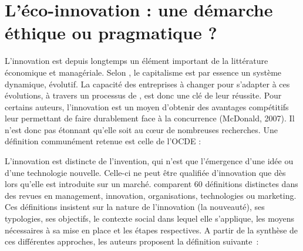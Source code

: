 \section{L'éco-innovation : une démarche éthique ou pragmatique ?}



    L'innovation est depuis longtemps un élément important de la littérature économique et managériale. Selon \textcite{schumpeter2006capitalism}, le capitalisme est par essence un système dynamique, évolutif. La capacité des entreprises à changer pour s’adapter à ces évolutions, à travers un processus de , est donc une clé de leur réussite. Pour certains auteurs, l’innovation est un moyen d’obtenir des avantages compétitifs leur permettant de faire durablement face à la concurrence (McDonald, 2007). Il n’est donc pas étonnant qu’elle soit au cœur de nombreuses recherches. Une définition communément retenue est celle de l’OCDE \parencite{oecd2005oslo} :
    \begin{quotation}
    \end{quotation}

    L’innovation est distincte de l’invention, qui n’est que l’émergence d’une idée ou d’une technologie nouvelle. Celle-ci ne peut être qualifiée d’innovation que dès lors qu’elle est introduite sur un marché. \textcite{baregheh2009towards} comparent 60 définitions distinctes dans des revues en management, innovation, organisations, technologies ou marketing. Ces définitions insistent sur la nature de l’innovation (la nouveauté), ses typologies, ses objectifs, le contexte social dans lequel elle s’applique, les moyens nécessaires à sa mise en place et les étapes respectives. A partir de la synthèse de ces différentes approches, les auteurs proposent la définition suivante :
        \begin{quotation}
        \end{quotation}

